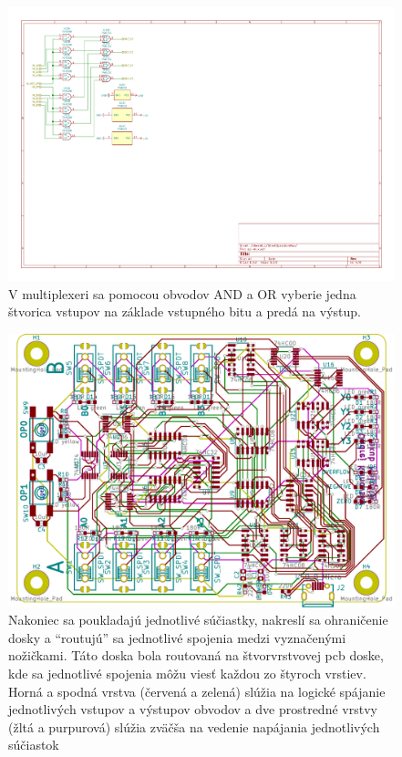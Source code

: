 \documentclass{article}
\begin{document}
    \begin{figure}[h!]
        \centering
        \includegraphics[width=.9\linewidth]{mux_sheet.pdf}
        \caption{V multiplexeri sa pomocou obvodov AND a OR vyberie jedna štvorica vstupov na základe vstupného bitu a predá na výstup.}
    \end{figure}
    
    \begin{figure}[h!]
        \centering
        \includegraphics[width=.9\linewidth]{pcb.pdf}
        \caption{Nakoniec sa poukladajú jednotlivé súčiastky, nakreslí sa ohraničenie dosky a ``routujú'' sa jednotlivé spojenia medzi vyznačenými nožičkami. Táto doska bola routovaná na štvorvrstvovej pcb doske, kde sa jednotlivé spojenia môžu viesť každou zo štyroch vrstiev. Horná a spodná vrstva (červená a zelená) slúžia na logické spájanie jednotlivých vstupov a výstupov obvodov a dve prostredné vrstvy (žltá a purpurová) slúžia zväčša na vedenie napájania jednotlivých súčiastok}
    \end{figure}
\end{document}
